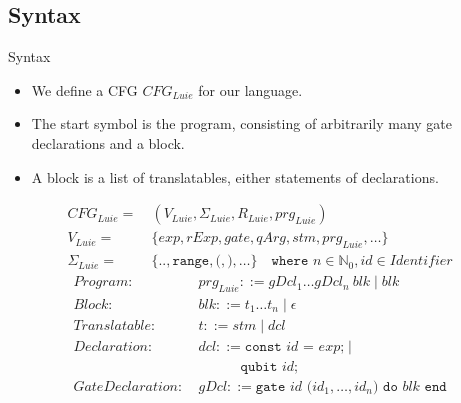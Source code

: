 \subsection{Syntax}
\begin{frame}{Syntax}
    \begin{itemize}
        \item We define a CFG $CFG_{Luie}$ for our language.
        \item The start symbol is the program, consisting of arbitrarily many gate declarations and a block.
        \item A block is a list of translatables, either statements of declarations.
    \end{itemize}
    \begin{align*}
        CFG_{Luie} = \ & (V_{Luie}, \Sigma_{Luie}, R_{Luie}, prg_{Luie} )\\ 
        V_{Luie} = \ & \{ exp, rExp, gate,  qArg, stm, prg_{Luie}, \dots \}\\ 
        \Sigma_{Luie} = \ & \{\texttt{..}, \texttt{range}, \texttt{(}, \texttt{)}, \dots \} 
        \quad \texttt{where } n \in \mathbb{N}_0, id \in Identifier
    \end{align*}
    \vspace{\alignmargin}
    \begin{align*}
        Program: \ & prg_{Luie} ::= gDcl_1 \dots gDcl_n \ blk \mid blk \\
        Block: \ & blk::= t_1 \dots t_n \mid \epsilon\\
        Translatable : \ & t::= stm \mid dcl\\
        Declaration: \ & dcl ::= \texttt{const } id \texttt{ = } exp \texttt{;} \mid \\
                     & \quad \quad \quad \texttt{qubit } id \texttt{;}\\
        GateDeclaration: \ & gDcl::= \texttt{gate } id \texttt{ (}id_1, \dots, id_n\texttt{) do } blk \texttt{ end}
    \end{align*}
\end{frame}


